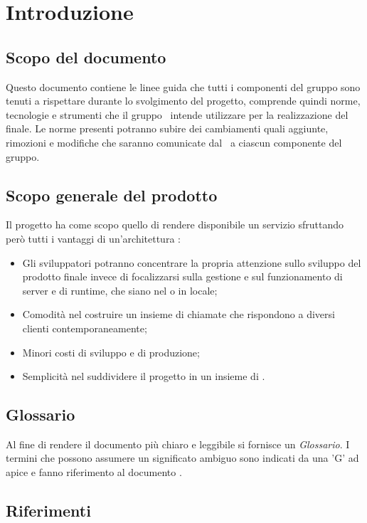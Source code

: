 \section{Introduzione}\label{Introduzione}
\subsection{Scopo del documento}\label{ScopoDocumento}
Questo documento contiene le linee guida che tutti i componenti del gruppo sono tenuti a rispettare durante lo svolgimento del progetto, comprende quindi norme, tecnologie e strumenti che il gruppo \Gruppo\ intende utilizzare per la realizzazione del  finale. 
Le norme presenti potranno subire dei cambiamenti quali aggiunte, rimozioni e modifiche che saranno comunicate dal \Responsabile\ a ciascun componente del gruppo.

\subsection{Scopo generale del prodotto}
Il progetto {\NomeProgetto} ha come scopo quello di rendere disponibile un servizio  sfruttando però tutti i vantaggi di un'architettura :
\begin{itemize}
    \item Gli sviluppatori potranno concentrare la propria attenzione sullo sviluppo del prodotto finale invece di focalizzarsi sulla gestione e sul funzionamento di server e di runtime, che siano nel  o in locale;
    \item Comodità nel costruire un insieme di chiamate  che rispondono a diversi clienti contemporaneamente;
    \item Minori costi di sviluppo e di produzione;
    \item Semplicità nel suddividere il progetto in un insieme di .
\end{itemize}

\subsection{Glossario}\label{Glossario}
Al fine di rendere il documento più chiaro e leggibile si fornisce un \textit{Glossario}. I termini che possono assumere un significato ambiguo sono indicati da una 'G' ad apice e fanno riferimento al documento .


\subsection{Riferimenti}
